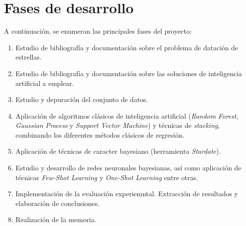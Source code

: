 \documentclass[12pt,oneside,a4paper]{article}
\begin{document}
\section{Fases de desarrollo}
A continuación, se enumeran las principales fases del proyecto:

\begin{enumerate}
\item Estudio de bibliografía y documentación sobre el problema de datación de estrellas.
\item Estudio de bibliografía y documentación sobre las soluciones de inteligencia artificial a emplear.
\item Estudio y depuración del conjunto de datos.
\item Aplicación de algoritmos clásicos de inteligencia artificial (\textit{Random Forest}, \textit{Gaussian Process} y \textit{Support Vector Machine}) y técnicas de \textit{stacking}, combinando los diferentes métodos clásicos de regresión.
\item Aplicación de técnicas de caracter bayesiano (herramienta \textit{Stardate}).
\item Estudio y desarrollo de redes neuronales bayesianas, así como aplicación de técnicas \textit{Few-Shot Learning} y \textit{One-Shot Learning} entre otras.
\item Implementación de la evaluación experiemntal. Extracción de resultados y elaboración de conclusiones.
\item Realización de la memoria.
\end{enumerate}

\newpage



\end{document}
